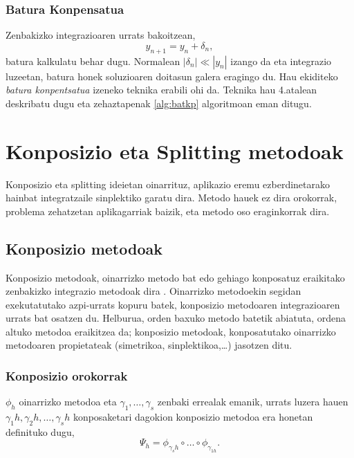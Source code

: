 \subsubsection*{Batura Konpensatua}

Zenbakizko integrazioaren urrats bakoitzean,
\begin{equation*}
y_{n+1}=y_{n}+ \delta_n,
\end{equation*}
batura kalkulatu behar dugu. Normalean $|\delta_n| \ll |y_n| $ izango da eta integrazio luzeetan, batura honek soluzioaren doitasun galera eragingo du. Hau ekiditeko \emph{batura konpentsatua} izeneko  teknika \cite{Muller2009,Higham2002,Hairer2006} erabili ohi da. Teknika hau 4.atalean deskribatu dugu eta zehaztapenak \ref{alg:batkp} algoritmoan eman ditugu.
 

\section{Konposizio eta Splitting metodoak}

Konposizio eta splitting ideietan oinarrituz, aplikazio eremu ezberdinetarako hainbat integratzaile sinplektiko \cite{SSerna2015b} garatu dira. Metodo hauek ez dira orokorrak, problema zehatzetan aplikagarriak baizik, eta metodo oso eraginkorrak dira.

\subsection{Konposizio metodoak}

Konposizio metodoak, oinarrizko metodo bat edo gehiago konposatuz eraikitako zenbakizko integrazio metodoak dira \cite{Hairer2006}.  Oinarrizko metodoekin segidan exekutatutako azpi-urrats kopuru batek, konposizio metodoaren integrazioaren urrats bat osatzen du. Helburua, orden baxuko metodo batetik abiatuta, ordena altuko metodoa eraikitzea da; konposizio metodoak, konposatutako oinarrizko metodoaren propietateak (simetrikoa, sinplektikoa,\dots) jasotzen ditu. 

\subsubsection*{Konposizio orokorrak}
$\phi_h$ oinarrizko metodoa eta $\gamma_1,\dots,\gamma_s$ zenbaki errealak emanik, urrats luzera hauen $\gamma_1 h,\gamma_2 h,\dots,\gamma_s h$ konposaketari dagokion konposizio metodoa era honetan definituko dugu,
\begin{equation}
\Psi_h=\phi_{\gamma_s h} \circ \dots \circ \phi_{\gamma_{1 h}}.
\end{equation}

